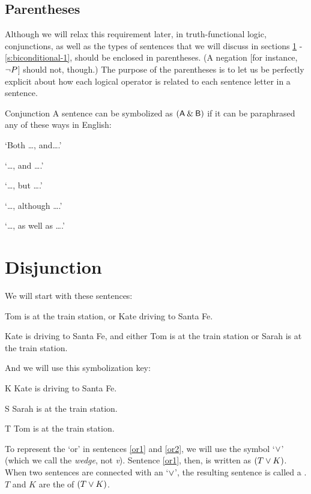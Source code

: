\subsection{Parentheses}

Although we will relax this requirement later, in truth-functional logic, conjunctions, as well as the types of sentences that we will discuss in sections \ref{s:ConnectiveDisjunction} - \ref{s:biconditional-1}, should be enclosed in parentheses. (A negation [for instance, ${\neg} P$] should not, though.) The purpose of the parentheses is to let us be perfectly explicit about how each logical operator is related to each sentence letter in a sentence. 


\begin{factboxy}{Conjunction}
A sentence can be symbolized as $(\mathsf{A}\mathbin{\&}\mathsf{B})$ if it can be paraphrased any of these ways in English:
\vspace{-2mm}
\begin{earg}
\item[] `Both \ldots, and\ldots.'
\item[] `\ldots, and \ldots.'
\item[] `\ldots, but \ldots.' 
\item[] `\ldots, although \ldots.'
\item[] `\ldots, as well as \ldots.'
\end{earg}
\end{factboxy}
	


\section{Disjunction}
\label{s:ConnectiveDisjunction}

We will start with these sentences:
	\begin{earg}
		\item[\ex{or1}] Tom is at the train station, or Kate driving to Santa Fe.
		\item[\ex{or2}] Kate is driving to Santa Fe, and either Tom is at the train station or Sarah is at the train station. 
	\end{earg}
And we will use this symbolization key:
	\begin{ekey}
		\item[K] Kate is driving to Santa Fe.
		\item[S] Sarah is at the train station.
		\item[T] Tom is at the train station.
	\end{ekey}
To represent the `or' in sentences \ref{or1} and \ref{or2}, we will use the symbol `$\vee$' (which we call the \textit{wedge}, not \textit{v}). Sentence \ref{or1}, then, is written as $(T \vee K)$. When two sentences are connected with an `$\vee$', the resulting sentence is called a . $T$ and $K$ are the  of $(T \vee K)$.

